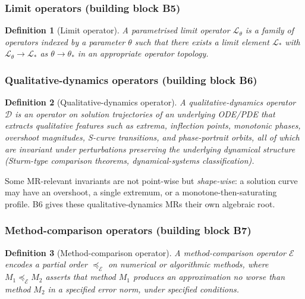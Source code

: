 \documentclass[manuscript]{acmart}
\newtheorem{definition}{Definition}
\begin{document}
\subsubsection{Limit operators (building block B5)}

\begin{definition}[Limit operator]
A \emph{parametrised limit operator} $\mathcal{L}_\theta$ is a family of operators indexed by a parameter $\theta$ such that there exists a limit element $\mathcal{L}_*$ with $\mathcal{L}_\theta \to \mathcal{L}_*$ as $\theta \to \theta_*$ in an appropriate operator topology.
\end{definition}

\subsubsection{Qualitative-dynamics operators (building block B6)}

\begin{definition}[Qualitative-dynamics operator]
A \emph{qualitative-dynamics operator} $\mathcal{D}$ is an operator on solution trajectories of an underlying ODE/PDE that extracts qualitative features such as extrema, inflection points, monotonic phases, overshoot magnitudes, S-curve transitions, and phase-portrait orbits, all of which are invariant under perturbations preserving the underlying dynamical structure (Sturm-type comparison theorems, dynamical-systems classification).
\end{definition}

Some MR-relevant invariants are not point-wise but \emph{shape-wise}: a solution curve may have an overshoot, a single extremum, or a monotone-then-saturating profile. B6 gives these qualitative-dynamics MRs their own algebraic root.

\subsubsection{Method-comparison operators (building block B7)}

\begin{definition}[Method-comparison operator]
A \emph{method-comparison operator} $\mathcal{E}$ encodes a partial order $\preceq_{\mathcal{E}}$ on numerical or algorithmic methods, where $M_1 \preceq_{\mathcal{E}} M_2$ asserts that method $M_1$ produces an approximation no worse than method $M_2$ in a specified error norm, under specified conditions.
\end{definition}
\end{document}
